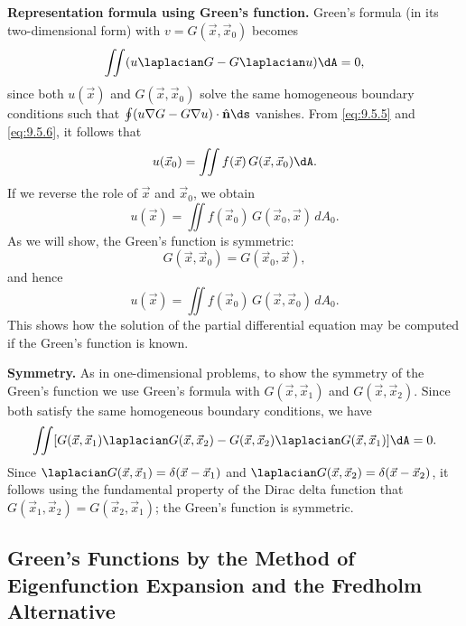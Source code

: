 \textbf{Representation formula using Green's function.}
Green's formula (in its two-dimensional form) with $v = G(\vec{x},\vec{x}_0)$ becomes
\[
\iint (u\laplacian G - G\laplacian u)\dA = 0,
\]
since both $u(\vec{x})$ and $G(\vec{x},\vec{x}_0)$ solve the same homogeneous boundary conditions such that $\oint(u\nabla G - G\nabla u)\cdot\hat{\mathbf{n}}\ds$ vanishes.  From \eqref{eq:9.5.5} and \eqref{eq:9.5.6}, it follows that
\[
u(\vec{x}_0) = \iint f(\vec{x})\,G(\vec{x},\vec{x}_0)\dA.
\]
If we reverse the role of $\vec{x}$ and $\vec{x}_0$, we obtain
\[
u(\vec{x}) = \iint f(\vec{x}_0)\,G(\vec{x}_0,\vec{x})\,dA_0.
\]
As we will show, the Green's function is symmetric:
\begin{equation}
\label{eq:9.5.7}
\boxed{G(\vec{x},\vec{x}_0) = G(\vec{x}_0,\vec{x}),}
\end{equation}
and hence
\begin{equation}
\label{eq:9.5.8}
\boxed{u(\vec{x}) = \iint f(\vec{x}_0)\,G(\vec{x},\vec{x}_0)\,dA_0.}
\end{equation}
This shows how the solution of the partial differential equation may be computed if the Green's function is known.

\textbf{Symmetry.}
As in one-dimensional problems, to show the symmetry of the Green's function we use Green's formula with $G(\vec{x},\vec{x}_1)$ and $G(\vec{x},\vec{x}_2)$.  Since both satisfy the same homogeneous boundary conditions, we have
\[
\iint [G(\vec{x},\vec{x}_1)\laplacian G(\vec{x},\vec{x}_2) - G(\vec{x},\vec{x}_2)\laplacian G(\vec{x},\vec{x}_1)]\dA = 0.
\]
Since $\laplacian G(\vec{x},\vec{x}_1) = \delta(\vec{x}-\vec{x}_1)$ and $\laplacian G(\vec{x},\vec{x}_2) = \delta(\vec{x}-\vec{x}_2)$, it follows using the fundamental property of the Dirac delta function that $G(\vec{x}_1,\vec{x}_2) = G(\vec{x}_2,\vec{x}_1)$; the Green's function is symmetric.

\subsection{Green's Functions by the Method of Eigenfunction Expansion and the Fredholm Alternative}
\label{sec:greens-poisson-eigexp}

